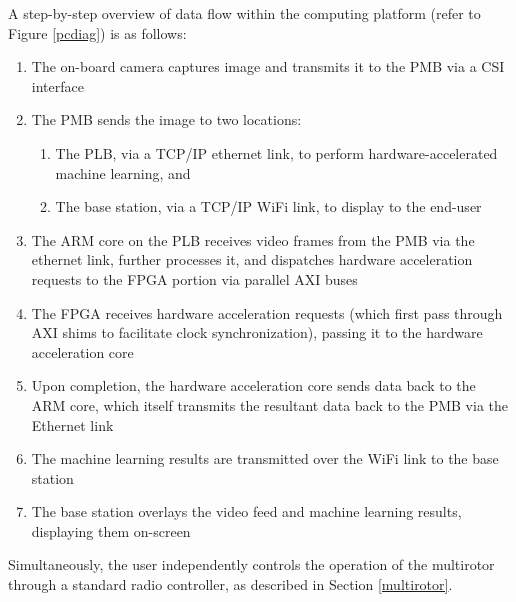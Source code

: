 A step-by-step overview of data flow within the computing platform (refer to Figure \ref{pcdiag}) is as follows:
\begin{enumerate}
\item The on-board camera captures image and transmits it to the PMB via a CSI interface
\item The PMB sends the image to two locations:
\begin{enumerate}
\item The PLB, via a TCP/IP ethernet link, to perform hardware-accelerated machine learning, and
\item The base station, via a TCP/IP WiFi link, to display to the end-user
\end{enumerate}
\item The ARM core on the PLB receives video frames from the PMB via the ethernet link, further processes it, and dispatches hardware acceleration requests to the FPGA portion via parallel AXI buses
\item The FPGA receives hardware acceleration requests (which first pass through AXI shims to facilitate clock synchronization), passing it to the hardware acceleration core
\item Upon completion, the hardware acceleration core sends data back to the ARM core, which itself transmits the resultant data back to the PMB via the Ethernet link
\item The machine learning results are transmitted over the WiFi link to the base station
\item The base station overlays the video feed and machine learning results, displaying them on-screen
\end{enumerate}

Simultaneously, the user independently controls the operation of the multirotor through a standard radio controller, as described in Section \ref{multirotor}.